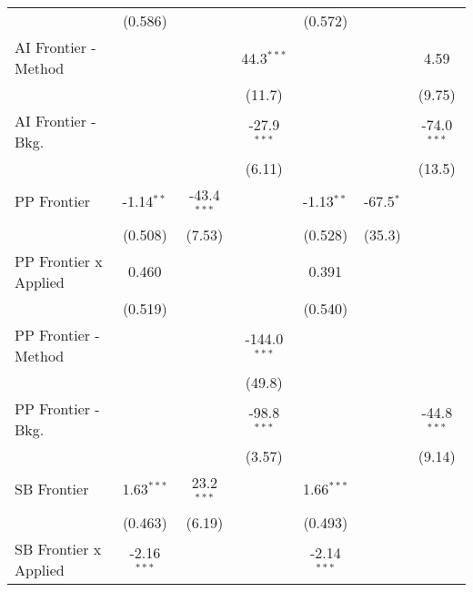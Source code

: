 \begin{tabular}{lcccccc}
                                & (0.586)       &               &                & (0.572)       &               &   \\   
   AI Frontier - Method         &               &               & 44.3$^{***}$   &               &               & 4.59\\   
                                &               &               & (11.7)         &               &               & (9.75)\\   
   AI Frontier - Bkg.           &               &               & -27.9$^{***}$  &               &               & -74.0$^{***}$\\   
                                &               &               & (6.11)         &               &               & (13.5)\\   
   PP Frontier                  & -1.14$^{**}$  & -43.4$^{***}$ &                & -1.13$^{**}$  & -67.5$^{*}$   &   \\   
                                & (0.508)       & (7.53)        &                & (0.528)       & (35.3)        &   \\   
   PP Frontier x Applied        & 0.460         &               &                & 0.391         &               &   \\   
                                & (0.519)       &               &                & (0.540)       &               &   \\   
   PP Frontier - Method         &               &               & -144.0$^{***}$ &               &               &   \\   
                                &               &               & (49.8)         &               &               &   \\   
   PP Frontier - Bkg.           &               &               & -98.8$^{***}$  &               &               & -44.8$^{***}$\\   
                                &               &               & (3.57)         &               &               & (9.14)\\   
   SB Frontier                  & 1.63$^{***}$  & 23.2$^{***}$  &                & 1.66$^{***}$  &               &   \\   
                                & (0.463)       & (6.19)        &                & (0.493)       &               &   \\   
   SB Frontier x Applied        & -2.16$^{***}$ &               &                & -2.14$^{***}$ &               &   \\   

\end{tabular}
